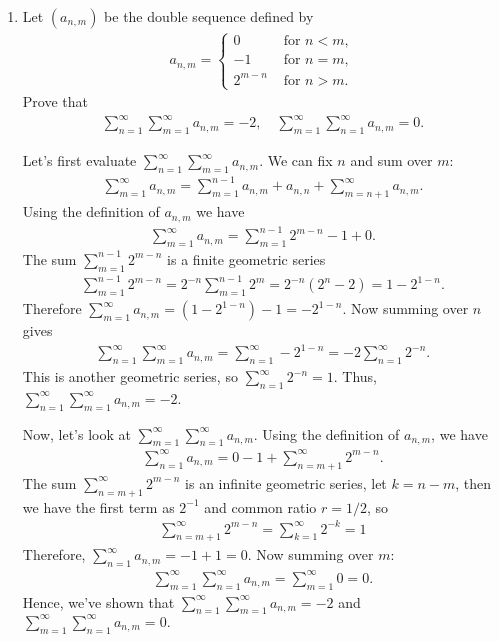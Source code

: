 \documentclass [10pt]{article}
\newcommand{\jg}[1]{{\color{blue} #1}}
\begin{document}
\begin{enumerate}
\item Let $(a_{n, m})$ be the double sequence defined by
\begin{align*}
a_{n,m}= \begin{cases}0 & \mbox{ for }n<m, \\ -1 & \mbox{ for } n=m, \\
2^{m-n} & \mbox{ for }n>m .\end{cases}
\end{align*}
Prove that
\begin{align*}
\sum_{n=1}^{\infty} \sum_{m=1}^{\infty} a_{n, m}=-2, \quad \sum_{m=1}^{\infty} \sum_{n=1}^{\infty} a_{n, m}=0.
\end{align*}

\jg{

Let's first evaluate $\sum_{n=1}^{\infty} \sum_{m=1}^{\infty} a_{n, m}$. We can fix $n$ and sum over $m$: 
\begin{align*}
    \sum_{m=1}^{\infty} a_{n,m} = \sum_{m=1}^{n-1} a_{n,m} + a_{n,n} + \sum_{m=n+1}^\infty a_{n,m}.
\end{align*}
Using the definition of $a_{n,m}$ we have 
\begin{align*}
    \sum_{m=1}^{\infty} a_{n,m} = \sum_{m=1}^{n-1} 2^{m-n} - 1 + 0.
\end{align*}
The sum $\sum_{m=1}^{n-1} 2^{m-n}$ is a finite geometric series 
\begin{align*}
    \sum_{m=1}^{n-1} 2^{m-n} = 2^{-n} \sum_{m=1}^{n-1} 2^m =  2^{-n} (2^n - 2) = 1 - 2^{1-n}.
\end{align*}
Therefore $\sum_{m=1}^\infty a_{n,m} = (1 - 2^{1-n}) - 1 = -2^{1-n}$. Now summing over $n$ gives 
\begin{align*}
    \sum_{n=1}^{\infty} \sum_{m=1}^{\infty} a_{n, m} = \sum_{n=1}^\infty -2^{1-n} = -2 \sum_{n=1}^\infty 2^{-n}.
\end{align*}
This is another geometric series, so $\sum_{n=1}^\infty 2^{-n} = 1$. Thus, $\sum_{n=1}^{\infty} \sum_{m=1}^{\infty} a_{n, m} = -2$. 

Now, let's look at $\sum_{m=1}^{\infty} \sum_{n=1}^{\infty} a_{n, m}$. Using the definition of $a_{n,m}$, we have 
\begin{align*}
    \sum_{n=1}^{\infty} a_{n, m} = 0 - 1 + \sum_{n=m+1}^\infty 2^{m-n}. 
\end{align*}
The sum $\sum_{n=m+1}^\infty 2^{m-n}$ is an infinite geometric series, let $k=n-m$, then we have the first term as $2^{-1}$ and common ratio $r = 1/2$, so 
\begin{align*}
    \sum_{n=m+1}^\infty 2^{m-n} = \sum_{k=1}^\infty 2^{-k} = 1
\end{align*}
Therefore, $\sum_{n=1}^{\infty} a_{n, m} = -1 + 1 = 0$. Now summing over $m$: 
\begin{align*}
    \sum_{m=1}^{\infty} \sum_{n=1}^{\infty} a_{n, m} = \sum_{m=1}^\infty 0 = 0.
\end{align*}
Hence, we've shown that $\sum_{n=1}^{\infty} \sum_{m=1}^{\infty} a_{n, m}=-2$ and $\sum_{m=1}^{\infty} \sum_{n=1}^{\infty} a_{n, m}=0.$

}
\end{enumerate}
\end{document}
